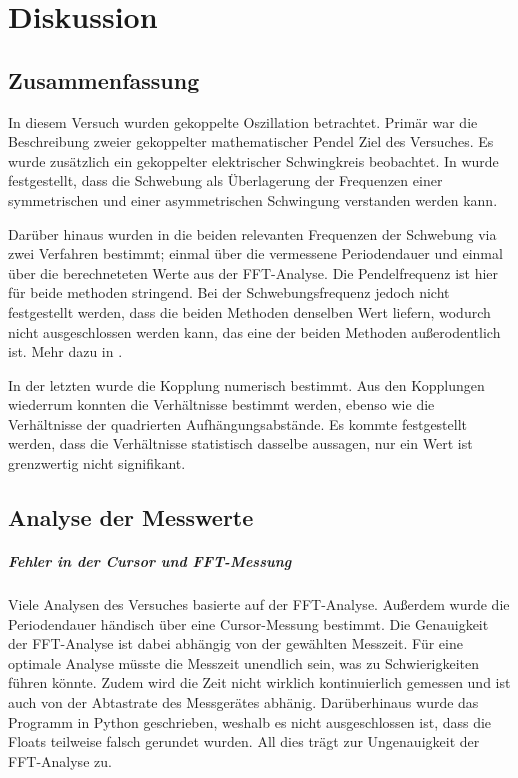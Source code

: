 \chapter{Diskussion}
\label{ch:Diskussion}

\section{Zusammenfassung}
\label{sec:Zusammenfassung}
In diesem Versuch wurden gekoppelte Oszillation betrachtet. Primär war die Beschreibung zweier gekoppelter mathematischer Pendel Ziel des Versuches. Es wurde zusätzlich ein gekoppelter elektrischer Schwingkreis beobachtet. 
In  wurde festgestellt, dass die Schwebung als Überlagerung der Frequenzen einer symmetrischen und einer asymmetrischen Schwingung verstanden werden kann.

Darüber hinaus wurden in  die beiden relevanten Frequenzen der Schwebung via zwei Verfahren bestimmt; einmal über die vermessene Periodendauer und einmal über die berechneteten Werte aus der FFT-Analyse. 
Die Pendelfrequenz ist hier für beide methoden stringend. Bei der Schwebungsfrequenz jedoch nicht festgestellt werden, dass die beiden Methoden denselben Wert liefern, wodurch nicht ausgeschlossen werden kann, das eine der beiden Methoden außerodentlich ist. Mehr dazu in .

In der letzten  wurde die Kopplung numerisch bestimmt. Aus den Kopplungen wiederrum konnten die Verhältnisse bestimmt werden, ebenso wie die Verhältnisse der quadrierten Aufhängungsabstände. Es kommte festgestellt werden, dass die Verhältnisse statistisch dasselbe aussagen, nur ein Wert ist grenzwertig nicht signifikant.

\section{Analyse der Messwerte}
\label{sec:Analyse}

\paragraph{Fehler in der Cursor und FFT-Messung}
Viele Analysen des Versuches basierte auf der FFT-Analyse. Außerdem wurde die Periodendauer händisch über eine Cursor-Messung bestimmt. Die Genauigkeit der FFT-Analyse ist dabei abhängig von der gewählten Messzeit. Für eine optimale Analyse müsste die Messzeit unendlich sein, was zu Schwierigkeiten führen könnte. 
Zudem wird die Zeit nicht wirklich kontinuierlich gemessen und ist auch von der Abtastrate des Messgerätes abhänig. Darüberhinaus wurde das Programm in Python geschrieben, weshalb es nicht ausgeschlossen ist, dass die Floats teilweise falsch gerundet wurden. All dies trägt zur Ungenauigkeit der FFT-Analyse zu.

